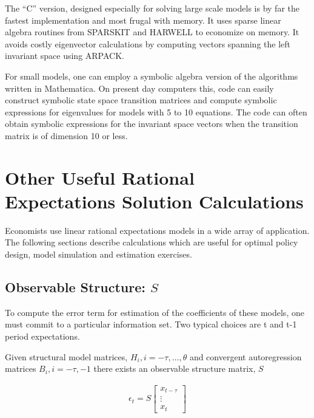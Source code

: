 \documentclass{elsart}
\begin{document}
The ``C'' version, designed especially for solving large scale
models is by far the fastest implementation and most frugal with memory.
It uses sparse linear algebra routines from SPARSKIT\cite{saad94} and
HARWELL\cite{nag95} to economize on
memory. It avoids costly eigenvector calculations by
computing vectors spanning the left invariant space using ARPACK\cite{lehoucq96}.

For small models, one can employ a symbolic algebra version of the
algorithms written in Mathematica. On present day computers this,
code can easily construct symbolic state space transition matrices and compute 
symbolic expressions for eigenvalues for models with 5 to 10 equations.
The code can often obtain symbolic expressions for the invariant space
vectors when the transition matrix is of dimension 10 or less.




\section{Other Useful Rational Expectations Solution Calculations}
\label{sec:useful}


Economists use linear rational expectations models in a wide array of
application. 
The following sections describe calculations which are 
useful for optimal policy design, model simulation and estimation exercises.




\subsection{Observable Structure:  $S$}

\label{sec:applications}



\label{sec:errorCalc}


To compute the error term for estimation of the coefficients of these models,
one must commit to a particular information set.
Two typical choices are t and t-1 period expectations.





Given structural model matrices, $H_i, i=-\tau,\ldots,\theta$ 
and 
 convergent autoregression matrices $B_i,i=-\tau,-1$
there exists an 
{ observable structure matrix,\/} $S$




\begin{gather}
  \epsilon_t= S \begin{bmatrix}
 x_{t-\tau}\\\vdots\\x_{t}
\end{bmatrix}
\end{gather}
\end{document}
